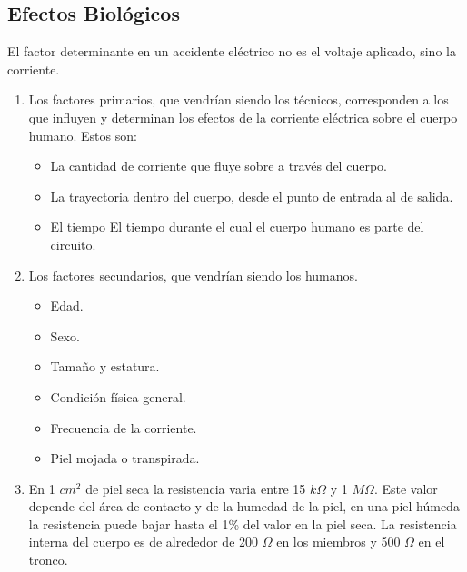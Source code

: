 \subsection{Efectos Biológicos}
El factor determinante en un accidente eléctrico no es el voltaje aplicado, sino la corriente.
\begin{enumerate}[resume]
     \item %
     Los factores primarios, que vendrían siendo los técnicos, corresponden a los que influyen y determinan los efectos de la corriente eléctrica sobre el cuerpo humano. Estos son:
     \begin{itemize}
         \item La cantidad de corriente que fluye sobre a través del cuerpo.
         \item La trayectoria dentro del cuerpo, desde el punto de entrada al de salida.
         \item El tiempo El tiempo durante el cual el cuerpo humano es parte del circuito.
     \end{itemize}
     \item %
     Los factores secundarios, que vendrían siendo los humanos.
     \begin{itemize}
         \item Edad.
         \item Sexo.
         \item Tamaño y estatura.
         \item Condición física general.
         \item Frecuencia de la corriente.
         \item Piel mojada o transpirada.
     \end{itemize}
     \item %
     En 1 $cm^2$ de piel seca la resistencia varia entre 15 $k\Omega$ y 1 $M\Omega$. Este valor depende del área de contacto y de la humedad de la piel, en una piel húmeda la resistencia puede bajar hasta el 1\% del valor en la piel seca.
     La resistencia interna del cuerpo es de alrededor de 200 $\Omega$ en los miembros y 500 $\Omega$ en el tronco.
   

\end{enumerate}
